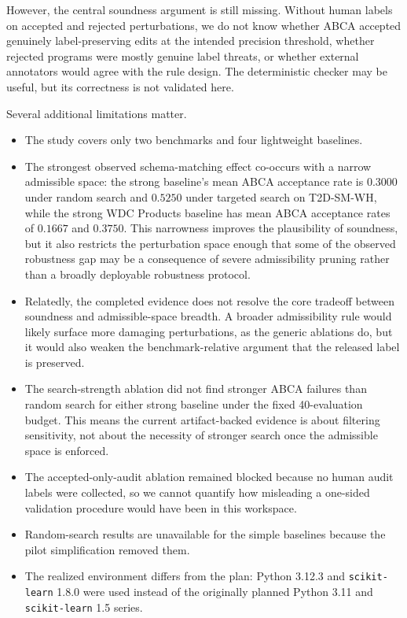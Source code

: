 \documentclass{article}
\newcommand{\abca}{\textsc{ABCA}}
\begin{document}
However, the central soundness argument is still missing. Without human labels on accepted and rejected perturbations, we do not know whether \abca{} accepted genuinely label-preserving edits at the intended precision threshold, whether rejected programs were mostly genuine label threats, or whether external annotators would agree with the rule design. The deterministic checker may be useful, but its correctness is not validated here.

Several additional limitations matter.
\begin{itemize}
  \item The study covers only two benchmarks and four lightweight baselines.
  \item The strongest observed schema-matching effect co-occurs with a narrow admissible space: the strong baseline's mean \abca{} acceptance rate is $0.3000$ under random search and $0.5250$ under targeted search on T2D-SM-WH, while the strong WDC Products baseline has mean \abca{} acceptance rates of $0.1667$ and $0.3750$. This narrowness improves the plausibility of soundness, but it also restricts the perturbation space enough that some of the observed robustness gap may be a consequence of severe admissibility pruning rather than a broadly deployable robustness protocol.
  \item Relatedly, the completed evidence does not resolve the core tradeoff between soundness and admissible-space breadth. A broader admissibility rule would likely surface more damaging perturbations, as the generic ablations do, but it would also weaken the benchmark-relative argument that the released label is preserved.
  \item The search-strength ablation did not find stronger \abca{} failures than random search for either strong baseline under the fixed 40-evaluation budget. This means the current artifact-backed evidence is about filtering sensitivity, not about the necessity of stronger search once the admissible space is enforced.
  \item The accepted-only-audit ablation remained blocked because no human audit labels were collected, so we cannot quantify how misleading a one-sided validation procedure would have been in this workspace.
  \item Random-search results are unavailable for the simple baselines because the pilot simplification removed them.
  \item The realized environment differs from the plan: Python 3.12.3 and \texttt{scikit-learn} 1.8.0 were used instead of the originally planned Python 3.11 and \texttt{scikit-learn} 1.5 series.
\end{itemize}
\end{document}
